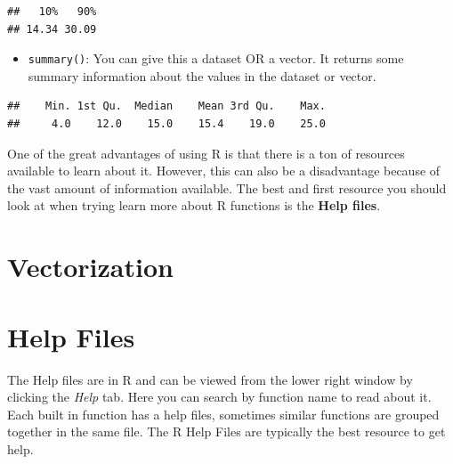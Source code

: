 \documentclass[
]{book}
\newenvironment{Shaded}{\begin{snugshade}}{\end{snugshade}}
\newcommand{\FloatTok}[1]{\textcolor[rgb]{0.00,0.00,0.81}{#1}}
\newcommand{\KeywordTok}[1]{\textcolor[rgb]{0.13,0.29,0.53}{\textbf{#1}}}
\newcommand{\NormalTok}[1]{#1}
\newcommand{\OperatorTok}[1]{\textcolor[rgb]{0.81,0.36,0.00}{\textbf{#1}}}
\providecommand{\tightlist}{%
  \setlength{\itemsep}{0pt}\setlength{\parskip}{0pt}}
\begin{document}
\begin{Shaded}
\end{Shaded}

\begin{verbatim}
##   10%   90% 
## 14.34 30.09
\end{verbatim}

\begin{itemize}
\tightlist
\item
  \texttt{summary()}: You can give this a dataset OR a vector. It returns some summary information about the values in the dataset or vector.
\end{itemize}

\begin{Shaded}
\end{Shaded}

\begin{verbatim}
##    Min. 1st Qu.  Median    Mean 3rd Qu.    Max. 
##     4.0    12.0    15.0    15.4    19.0    25.0
\end{verbatim}

One of the great advantages of using R is that there is a ton of resources available to learn about it. However, this can also be a disadvantage because of the vast amount of information available. The best and first resource you should look at when trying learn more about R functions is the \textbf{Help files}.

\hypertarget{vectorization}{%
\section{Vectorization}\label{vectorization}}

\hypertarget{help-files}{%
\section{Help Files}\label{help-files}}

The Help files are in R and can be viewed from the lower right window by clicking the \emph{Help} tab. Here you can search by function name to read about it. Each built in function has a help files, sometimes similar functions are grouped together in the same file. The R Help Files are typically the best resource to get help.
\end{document}
